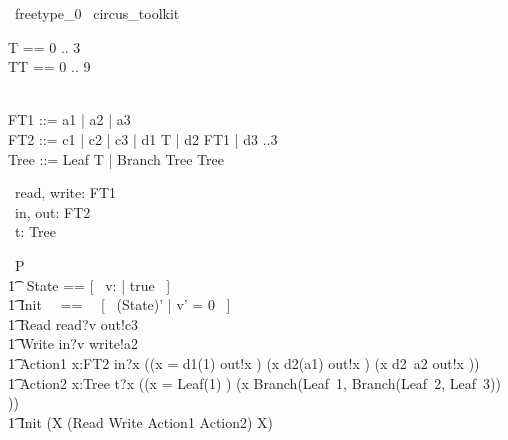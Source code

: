 \begin{zsection}
  \SECTION\ freetype\_0 \parents\ circus\_toolkit
\end{zsection}

\begin{zed}
	T == 0 .. 3 \\
	TT == 0 .. 9 \\
    [NAME, PERSON] \\
\end{zed}

\begin{zed}
    FT1 ::= a1 | a2 | a3  \\
    FT2 ::= c1 | c2 | c3 | d1 \ldata T \rdata | d2 \ldata FT1 \rdata | d3 ..3 \rdata \\
    Tree ::= Leaf \ldata T \rdata | Branch \ldata Tree \cross Tree \rdata \\
\end{zed}

\begin{circus}
	\circchannel\ read, write: FT1 \\
	\circchannel\ in, out: FT2 \\
	\circchannel\ t: Tree\\
\end{circus}

\begin{circus}
    \circprocess\ P \circdef \circbegin \\
        \t1 \circstate\ State == [~ v: \nat | true ~] \\
        \t1 Init ~~==~~ [~ (State)' | v' = 0 ~] \\
        \t1 Read \circdef read?v \then out!c3 \then \Skip \\
        \t1 Write \circdef in?v \then write!a2 \then \Skip \\
        \t1 Action1 \circdef \circvar x:FT2 \circspot in?x \then ((\lcircguard x = d1(1) \rcircguard \circguard out!x \then \Skip) \extchoice (\lcircguard x \neq d2(a1) \rcircguard \circguard out!x \then \Skip) \extchoice (\lcircguard x \neq d2~a2 \rcircguard \circguard out!x \then \Skip)) \\
        \t1 Action2 \circdef \circvar x:Tree \circspot t?x \then ((\lcircguard x = Leaf(1) \rcircguard \circguard \Skip) \extchoice (\lcircguard x \neq Branch(Leaf~1, Branch(Leaf~2, Leaf~3)) \rcircguard \circguard \Skip)) \\
        \t1 \circspot \lschexpract Init \rschexpract \circseq (\circmu X \circspot (Read \extchoice Write \extchoice Action1 \extchoice Action2) \circseq X) \\ 
	\circend
\end{circus}

